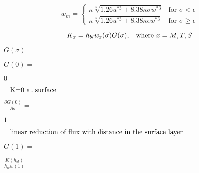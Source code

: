 {\newpage\clearpage
{}%
\begin{displaymath}
w_m=\left\{
        \begin{array}{ll}
      \kappa  \sqrt[3]{1.26u^{*3}+8.38\kappa \sigma w^{*3}}
        & \mbox{for } \sigma<\epsilon\\
      \kappa  \sqrt[3]{1.26u^{*3}+8.38\kappa \epsilon w^{*3}}
        & \mbox{for } \sigma \ge \epsilon
        \end{array}
\right.
\end{displaymath}%
\lthtmldisplayZ
\lthtmlcheckvsize\clearpage}

{\newpage\clearpage
{}%
\begin{displaymath}
K_x = h_{bl}w_x(\sigma)G(\sigma), \;\;\; \hbox{where }x=M,T,S
\end{displaymath}%
\lthtmldisplayZ
\lthtmlcheckvsize\clearpage}

{\newpage\clearpage
{}%
$G(\sigma)$%
\lthtmlinlinemathZ
\lthtmlcheckvsize\clearpage}

{\newpage\clearpage
{}%
$\displaystyle G(0)  =$%
\lthtmlindisplaymathZ
\lthtmlcheckvsize\clearpage}

{\newpage\clearpage
{}%
$\textstyle 0$%
\lthtmlindisplaymathZ
\lthtmlcheckvsize\clearpage}

{\newpage\clearpage
{}%
$\displaystyle \;\;\; \hbox{K=0 at surface}$%
\lthtmlindisplaymathZ
\lthtmlcheckvsize\clearpage}

{\newpage\clearpage
{}%
$\displaystyle \frac{\partial G(0)}{\partial \sigma}  =$%
\lthtmlindisplaymathZ
\lthtmlcheckvsize\clearpage}

{\newpage\clearpage
{}%
$\textstyle 1$%
\lthtmlindisplaymathZ
\lthtmlcheckvsize\clearpage}

{\newpage\clearpage
{}%
$\displaystyle \;\;\;
\hbox{linear reduction of flux with distance in the surface
layer}$%
\lthtmlindisplaymathZ
\lthtmlcheckvsize\clearpage}

{\newpage\clearpage
{}%
$\displaystyle G(1)  =$%
\lthtmlindisplaymathZ
\lthtmlcheckvsize\clearpage}

{\newpage\clearpage
{}%
$\textstyle \frac{K(h_{bl})}{h_{bl}w(1)}$%
\lthtmlindisplaymathZ
\lthtmlcheckvsize\clearpage}

